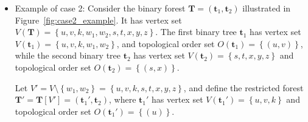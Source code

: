 \documentclass[superscriptaddress,onecolumn,nofootinbib,longbibliography,a4paper,accepted=2026-09-29]{quantumarticle}
\theoremstyle{plain}
\theoremstyle{definition}
\numberwithin{thm}{section}
\numberwithin{assumption}{section}
\numberwithin{lemma}{section}
\numberwithin{prop}{section}
\numberwithin{cor}{section}
\numberwithin{definition}{section}
\numberwithin{rmk}{section}
\numberwithin{equation}{section}
\newcommand{\lrcb}[1]{\left \{ #1 \right \}}
\newcommand{\mbt}{\mathbf{t}}
\newcommand{\mbf}{\mathbf{T}}
\begin{document}
\begin{itemize}
Meanwhile, the $\gamma$ functions of $\mbf$ and $\mbf'$ with respect to their labelings are given by:
\begin{align}
\gamma(\mbf,h)&=\frac{1}{\lambda_{h(w_1)}+\lambda_{h(w_2)}-\lambda_{h(v)}}
\cdot \frac{1}{\lambda_{h(t)}+\lambda_{h(x)}-\lambda_{h(s)}} \cdot 
\frac{1}{\lambda_{h(t)}+\lambda_{h(y)}+\lambda_{h(z)}-\lambda_{h(s)}}, \\    
\gamma(\mbf',h')&=\frac{1}{\lambda_{h(t)}+\lambda_{h(x)}-\lambda_{h(s)}} \cdot 
\frac{1}{\lambda_{h(t)}+\lambda_{h(y)}+\lambda_{h(z)}-\lambda_{h(s)}},
\end{align}
and they satisfy the relationship
\begin{align}
\gamma(\mbf,h)=\frac{1}{\lambda_{h(w_1)}+\lambda_{h(w_2)}-\lambda_{h(v)}}
\cdot \gamma(\mbf',h').    
\end{align}

By direct calculation, one can verify that:
\begin{align}
\sum_{p=1}^{2} (-1)^p
\sum_{\Omega' \in \mathcal{L}_{p}(\mbf')} 
\bar{\beta}(\mbf', \Omega', h')   
=\gamma(\mbf', h'),
\end{align}

Then it follows that
\begin{align}
\sum_{p=1}^{3} (-1)^p
\sum_{\Omega \in \mathcal{L}_{p}(\mbf)} 
\bar{\beta}(\mbf, \Omega, h)  
&=-\frac{1}{\lambda_{h(w_1)}+\lambda_{h(w_2)}-\lambda_{h(v)}} \cdot
\sum_{p=1}^{2} (-1)^p
\sum_{\Omega' \in \mathcal{L}_{p}(\mbf')} 
\bar{\beta}(\mbf', \Omega', h')    \\
&=-\frac{1}{\lambda_{h(w_1)}+\lambda_{h(w_2)}-\lambda_{h(v)}} \cdot \gamma(\mbf', h') \\
&=-\gamma(\mbf, h),
\end{align}
as desired.

\item Example of case 2: Consider the binary forest $\mbf=(\mbt_1,\mbt_2)$ illustrated in Figure~\ref{fig:case2_example}. It has vertex set $V(\mbf)=\lrcb{u, v, k, w_1, w_2, s, t, x, y, z}$. The first binary tree $\mbt_1$ has vertex set $V(\mbt_1)=\lrcb{u, v, k, w_1, w_2}$, and topological order set $O(\mbt_1)=\lrcb{(u, v)}$, while the second binary tree $\mbt_2$ has vertex set $V(\mbt_2)=\lrcb{s, t, x, y, z}$ and topological order set $O(\mbt_2)=\lrcb{(s, x)}$.
    
Let $V'=V\setminus\lrcb{w_1,w_2}=\lrcb{u, v, k, s, t, x, y, z}$, and define the restricted forest $\mbf'=\mbf[V']=(\mbt_1', \mbt_2)$, where $\mbt_1'$ has vertex set $V(\mbt_1')=\lrcb{u,v,k}$ and topological order set $O(\mbt_1')=\lrcb{(u)}$. 


\end{itemize}
\end{document}
